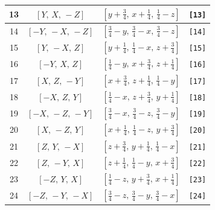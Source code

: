 \documentclass[fleqn,8pt]{jsarticle}
\begin{document}
\begin{longtable}{cccc}
13 & $\left[ Y,\, X,\, - Z \right]$ & $\left[ y + \frac{3}{4},\, x + \frac{1}{4},\, \frac{1}{4} - z \right]$ & {\tt [13]} \\ \hline
14 & $\left[ - Y,\, - X,\, - Z \right]$ & $\left[ \frac{3}{4} - y,\, \frac{3}{4} - x,\, \frac{3}{4} - z \right]$ & {\tt [14]} \\ \hline
15 & $\left[ Y,\, - X,\, Z \right]$ & $\left[ y + \frac{1}{4},\, \frac{1}{4} - x,\, z + \frac{3}{4} \right]$ & {\tt [15]} \\ \hline
16 & $\left[ - Y,\, X,\, Z \right]$ & $\left[ \frac{1}{4} - y,\, x + \frac{3}{4},\, z + \frac{1}{4} \right]$ & {\tt [16]} \\ \hline
17 & $\left[ X,\, Z,\, - Y \right]$ & $\left[ x + \frac{3}{4},\, z + \frac{1}{4},\, \frac{1}{4} - y \right]$ & {\tt [17]} \\ \hline
18 & $\left[ - X,\, Z,\, Y \right]$ & $\left[ \frac{1}{4} - x,\, z + \frac{3}{4},\, y + \frac{1}{4} \right]$ & {\tt [18]} \\ \hline
19 & $\left[ - X,\, - Z,\, - Y \right]$ & $\left[ \frac{3}{4} - x,\, \frac{3}{4} - z,\, \frac{3}{4} - y \right]$ & {\tt [19]} \\ \hline
20 & $\left[ X,\, - Z,\, Y \right]$ & $\left[ x + \frac{1}{4},\, \frac{1}{4} - z,\, y + \frac{3}{4} \right]$ & {\tt [20]} \\ \hline
21 & $\left[ Z,\, Y,\, - X \right]$ & $\left[ z + \frac{3}{4},\, y + \frac{1}{4},\, \frac{1}{4} - x \right]$ & {\tt [21]} \\ \hline
22 & $\left[ Z,\, - Y,\, X \right]$ & $\left[ z + \frac{1}{4},\, \frac{1}{4} - y,\, x + \frac{3}{4} \right]$ & {\tt [22]} \\ \hline
23 & $\left[ - Z,\, Y,\, X \right]$ & $\left[ \frac{1}{4} - z,\, y + \frac{3}{4},\, x + \frac{1}{4} \right]$ & {\tt [23]} \\ \hline
24 & $\left[ - Z,\, - Y,\, - X \right]$ & $\left[ \frac{3}{4} - z,\, \frac{3}{4} - y,\, \frac{3}{4} - x \right]$ & {\tt [24]} \\
\end{longtable}
\end{document}
